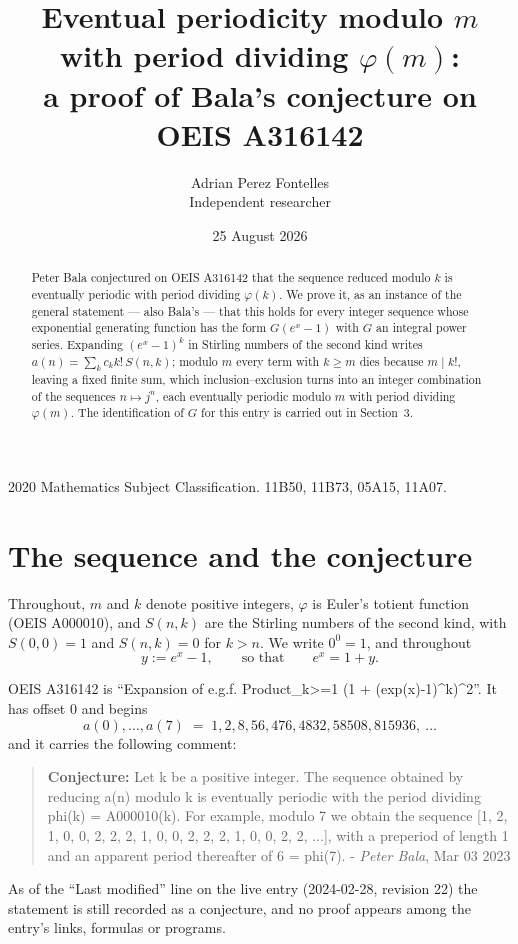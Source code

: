 \documentclass[11pt,a4paper]{article}
\title{Eventual periodicity modulo $m$ with period dividing $\varphi(m)$:\\a proof of Bala's conjecture on OEIS A316142}
\author{Adrian Perez Fontelles\\ \small Independent researcher}
\date{25 August 2026}
\theoremstyle{plain}
\theoremstyle{definition}
\begin{document}
\maketitle

\begin{abstract}
Peter Bala conjectured on OEIS A316142 that the sequence reduced modulo $k$ is eventually periodic with period dividing $\varphi(k)$. We prove it, as an instance of the general statement --- also Bala's --- that this holds for every integer sequence whose exponential generating function has the form $G(e^{x}-1)$ with $G$ an integral power series. Expanding $(e^{x}-1)^{k}$ in Stirling numbers of the second kind writes $a(n)=\sum_{k}c_{k}k!\,S(n,k)$; modulo $m$ every term with $k\ge m$ dies because $m\mid k!$, leaving a fixed finite sum, which inclusion--exclusion turns into an integer combination of the sequences $n\mapsto j^{n}$, each eventually periodic modulo $m$ with period dividing $\varphi(m)$. The identification of $G$ for this entry is carried out in Section~3.
\end{abstract}

\noindent\small 2020 Mathematics Subject Classification. 11B50, 11B73, 05A15, 11A07.\normalsize

\section{The sequence and the conjecture}

Throughout, $m$ and $k$ denote positive integers, $\varphi$ is Euler's totient function
(OEIS A000010), and $S(n,k)$ are the Stirling numbers of the second kind, with
$S(0,0)=1$ and $S(n,k)=0$ for $k>n$. We write $0^{0}=1$, and throughout
\[
y := e^{x}-1, \qquad\text{so that}\qquad e^{x}=1+y .
\]

OEIS A316142 is ``Expansion of e.g.f. Product\_{k>=1} (1 + (exp(x)-1)\^{}k)\^{}2''. It has offset $0$ and begins
\[
a(0),\dots,a(7)\;=\;1, 2, 8, 56, 476, 4832, 58508, 815936,\ \dots
\]
and it carries the following comment:
\begin{quote}\small
\textbf{Conjecture:} Let k be a positive integer. The sequence obtained by reducing a(n) modulo k is eventually periodic with the period dividing phi(k) = A000010(k). For example, modulo 7 we obtain the sequence [1, 2, 1, 0, 0, 2, 2, 2, 1, 0, 0, 2, 2, 2, 1, 0, 0, 2, 2, ...], with a preperiod of length 1 and an apparent period thereafter of 6 = phi(7). - \emph{Peter Bala}, Mar 03 2023
\end{quote}
As of the ``Last modified'' line on the live entry (2024-02-28, revision 22) the
statement is still recorded as a conjecture, and no proof appears among the entry's links,
formulas or programs.
\end{document}
